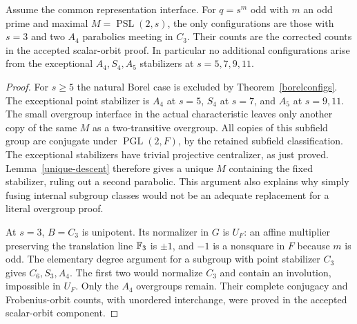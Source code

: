 \documentclass[11pt]{article}
\newcommand{\PSL}{\operatorname{PSL}}\newcommand{\PGL}{\operatorname{PGL}}
\begin{document}
\begin{theorem}\label{odd}
Assume the common representation interface. For $q=s^m$ odd with
$m$ an odd prime and maximal $M=\PSL(2,s)$, the only configurations
are those with $s=3$ and two $A_4$ parabolics meeting in $C_3$.
Their counts are the corrected counts in the accepted scalar-orbit
proof. In particular no additional configurations arise from the
exceptional $A_4,S_4,A_5$ stabilizers at $s=5,7,9,11$.
\end{theorem}
\begin{proof}
For $s\ge5$ the natural Borel case is excluded by
Theorem~\ref{borelconfigs}. The exceptional point stabilizer is
$A_4$ at $s=5$, $S_4$ at $s=7$, and $A_5$ at $s=9,11$.
The small overgroup interface in the actual characteristic leaves
only another copy of the same $M$ as a two-transitive overgroup.
All copies of this subfield group are conjugate under
$\PGL(2,F)$, by the retained subfield classification. The exceptional
stabilizers have trivial projective centralizer, as just proved.
Lemma~\ref{unique-descent} therefore gives a unique $M$ containing
the fixed stabilizer, ruling out a second parabolic. This argument
also explains why simply fusing internal subgroup classes would not
be an adequate replacement for a literal overgroup proof.

At $s=3$, $B=C_3$ is unipotent. Its normalizer in $G$ is $U_F$:
an affine multiplier preserving the translation line $\mathbb F_3$ is
$\pm1$, and $-1$ is a nonsquare in $F$ because $m$ is odd.
The elementary degree argument for a subgroup with point stabilizer
$C_3$ gives $C_6,S_3,A_4$. The first two would normalize $C_3$
and contain an involution, impossible in $U_F$. Only the $A_4$
overgroups remain. Their complete conjugacy and Frobenius-orbit
counts, with unordered interchange, were proved in the accepted
scalar-orbit component.
\end{proof}
\end{document}
